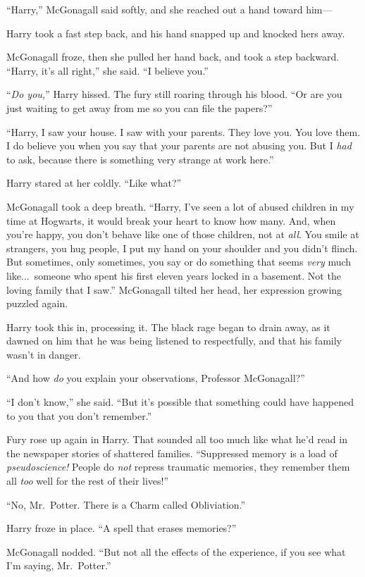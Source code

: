 “Harry,” McGonagall said softly, and she reached out a hand toward him—

Harry took a fast step back, and his hand snapped up and knocked hers away.

McGonagall froze, then she pulled her hand back, and took a step backward. “Harry, it’s all right,” she said. “I believe you.”

“\emph{Do you,}” Harry hissed. The fury still roaring through his blood. “Or are you just waiting to get away from me so you can file the papers?”

“Harry, I saw your house. I saw with your parents. They love you. You love them. I do believe you when you say that your parents are not abusing you. But I \emph{had} to ask, because there is something very strange at work here.”

Harry stared at her coldly. “Like what?”

McGonagall took a deep breath. “Harry, I’ve seen a lot of abused children in my time at Hogwarts, it would break your heart to know how many. And, when you’re happy, you don’t behave like one of those children, not at \emph{all}. You smile at strangers, you hug people, I put my hand on your shoulder and you didn’t flinch. But sometimes, only sometimes, you say or do something that seems \emph{very} much like...\ someone who spent his first eleven years locked in a basement. Not the loving family that I saw.” McGonagall tilted her head, her expression growing puzzled again.

Harry took this in, processing it. The black rage began to drain away, as it dawned on him that he was being listened to respectfully, and that his family wasn’t in danger.

“And how \emph{do} you explain your observations, Professor McGonagall?”

“I don’t know,” she said. “But it’s possible that something could have happened to you that you don’t remember.”

Fury rose up again in Harry. That sounded all too much like what he’d read in the newspaper stories of shattered families. “Suppressed memory is a load of \emph{pseudoscience!} People do \emph{not} repress traumatic memories, they remember them all \emph{too} well for the rest of their lives!”

“No, Mr.~Potter. There is a Charm called Obliviation.”

Harry froze in place. “A spell that erases memories?”

McGonagall nodded. “But not all the effects of the experience, if you see what I’m saying, Mr.~Potter.”

